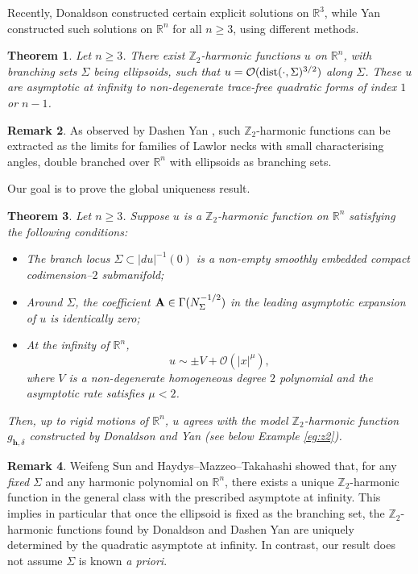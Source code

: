 \documentclass[11pt,a4paper]{article}
\numberwithin{equation}{section}%
\newtheorem{thm}{Theorem}[section]
\theoremstyle{definition}
\newtheorem{rmk}[thm]{Remark}
\newcommand{\R}{\mathbb{R}}
\newcommand{\bmh}{\boldsymbol{h}}
\newcommand{\Z}{\mathbb{Z}}
\begin{document}
Recently, Donaldson \cite{Donaldson-Twistor} constructed certain explicit solutions on $\R^3$, while Yan \cite{Yan-Construction} constructed such solutions on $\R^n$ for all $n\geqslant 3$, using different methods.

\begin{thm}
Let $n\geqslant 3$. 
There exist $\Z_2$-harmonic functions $u$ on $\R^n$, with branching sets $\Sigma$ being ellipsoids, such that $u=\mathcal{O}(\textnormal{dist}(\cdot, \Sigma)^{3/2})$ along $\Sigma$. 
These $u$ are asymptotic at infinity to non-degenerate trace-free quadratic forms of index $1$ or $n-1$. 
\end{thm}


\begin{rmk}
As observed by Dashen Yan \cite{Yan-Construction}, such $\Z_2$-harmonic functions can  be extracted as the limits for families of Lawlor necks \cite{Lawlor} with small characterising angles, double branched over $\R^n$ with ellipsoids as branching sets. 
\end{rmk}


Our goal is to prove the global uniqueness result. 

\begin{thm}\label{mainthm}
Let $n\geqslant 3$. Suppose $u$ is a $\Z_2$-harmonic function on $\R^n$ satisfying the following conditions:
\begin{itemize}
    \item The branch locus $\Sigma\subset |du|^{-1}(0)$ is a non-empty smoothly embedded compact codimension--$2$ submanifold; 
    \item Around $\Sigma$, the coefficient ${\bf{A}}\in \Gamma(N_\Sigma^{-1/2})$ in the leading asymptotic expansion of $u$ is identically zero;
    \item At the infinity of $\R^n$, 
    \begin{equation}
        \label{eqn:asym-of-u}
 u \sim \pm V + \mathcal{O}(|x|^\mu),
    \end{equation}
where $V$ is a non-degenerate homogeneous degree $2$ polynomial and the asymptotic rate satisfies $\mu<2$. 
\end{itemize}

Then, up to rigid motions of $\R^n$, $u$ agrees with the model $\Z_2$-harmonic function $g_{\bmh,\delta}$ constructed by Donaldson and Yan (see below Example \textnormal{\ref{eg:z2}}).
\end{thm}

\begin{rmk}
Weifeng Sun \cite{Sun-Pell} and Haydys--Mazzeo--Takahashi \cite{Haydys-Mazzeo-Takahashi-Examples} showed that, for any \textit{fixed} $\Sigma$ and any harmonic polynomial on $\R^n$, there exists a unique $\Z_2$-harmonic function in the general class with the prescribed asymptote at infinity. This implies in particular that once the ellipsoid is fixed as the branching set, the $\Z_2$-harmonic functions found by Donaldson and Dashen Yan are uniquely determined by the quadratic asymptote at infinity. In contrast, our result does not assume $\Sigma$ is known \textit{a priori}.
\end{rmk}
\end{document}

